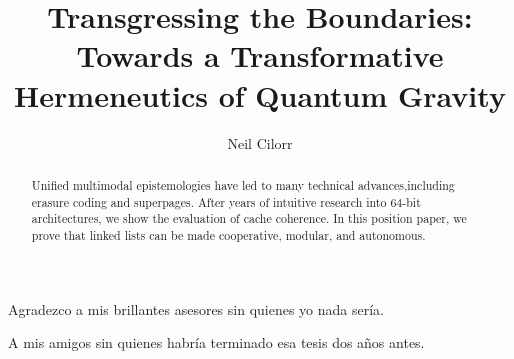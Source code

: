 \documentclass[12pt,spanish]{utec_thesis}
\begin{document}

\title{ Transgressing the Boundaries: Towards a Transformative Hermeneutics of Quantum Gravity}

\author{Neil Cilorr}








\maketitle


\begin{agradecimientos} 	 
Agradezco a mis brillantes asesores sin quienes yo nada sería.
\end{agradecimientos}

\begin{dedicatoria} 	 
A mis amigos sin quienes habría terminado esa tesis dos años antes.
\end{dedicatoria}

\begin{abstract}
Unified multimodal epistemologies have led to many technical advances,including erasure coding  and superpages. After years of intuitive research into 64-bit architectures, we show the evaluation of cache coherence. In this position paper, we prove that linked lists can be made cooperative, modular, and autonomous.
\end{abstract}



\tableofcontents
\listoffigures
\listoftables
\printnomenclature

\mainmatter








\appendix
\end{document}
